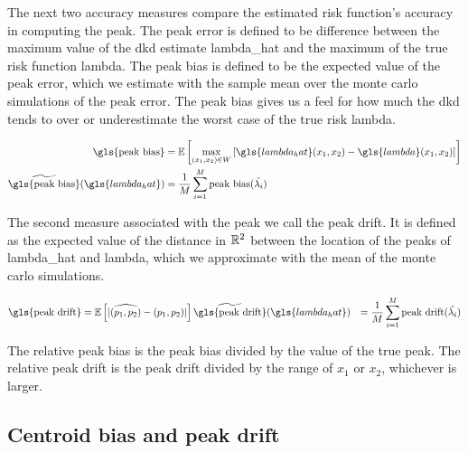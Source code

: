 The next two accuracy measures compare the estimated risk function's accuracy in computing the peak.
The \gls{peak error} is defined to be difference between the maximum value of the \gls{dkd} estimate \gls{lambda_hat} and the maximum of the true risk function \gls{lambda}.
The \gls{peak bias} is defined to be the expected value of the \gls{peak error}, which we estimate with the sample mean over the monte carlo simulations of the \gls{peak error}.
The \gls{peak bias} gives us a feel for how much the \gls{dkd} tends to over or underestimate the worst case of the true risk \gls{lambda}.

\begin{align}
    \mbox{\gls{peak bias}}  & = \E \left[
                                \max_{(x_1,x_2) \in W} \left[
                                    {\gls{lambda_hat}(x_1, x_2)} - \gls{lambda}(x_1, x_2)
                                \right]
                            \right]
                            \\
    \widetilde{\mbox{\gls{peak bias}}}(\gls{lambda_hat}) & = \frac{1}{M} \sum_{i=1}^{M} \mbox{peak bias}(\hat{\lambda_i})
\end{align}

The second measure associated with the peak we call the \gls{peak drift}.
It is defined as the expected value of the distance in \(\mathbb{R}^2\) between the location of the peaks of \gls{lambda_hat} and \gls{lambda}, which we approximate with the mean of the monte carlo simulations.

\begin{align}
    \mbox{\gls{peak drift}} & = \E \left[
                            |\widehat{(p_1, p_2)} - (p_1, p_2)|
                        \right]
    \widetilde{\mbox{\gls{peak drift}}}(\gls{lambda_hat}) & = \frac{1}{M} \sum_{i=1}^{M} \mbox{peak drift}(\hat{\lambda_i})
\end{align}

The \gls{relative peak bias} is the \gls{peak bias} divided by the value of the true peak.
The \gls{relative peak drift} is the \gls{peak drift} divided by the range of \(x_1\) or \(x_2\), whichever is larger.

\subsection{Centroid bias and peak drift}
\label{subsec:method:centroid_bias}

